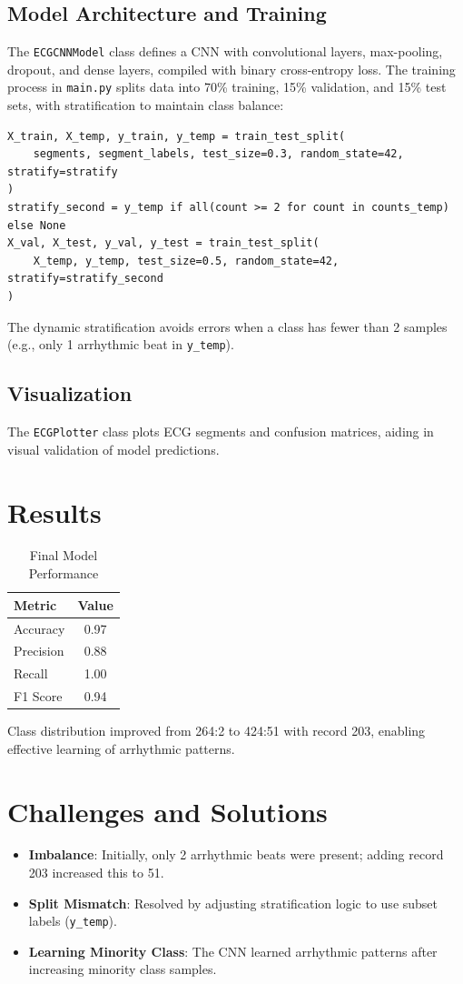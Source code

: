 \documentclass[a4paper,12pt]{article}
\begin{document}
\subsection{Model Architecture and Training}
The \texttt{ECGCNNModel} class defines a CNN with convolutional layers, max-pooling, dropout, and dense layers, compiled with binary cross-entropy loss. The training process in \texttt{main.py} splits data into 70\% training, 15\% validation, and 15\% test sets, with stratification to maintain class balance:
\begin{lstlisting}
X_train, X_temp, y_train, y_temp = train_test_split(
    segments, segment_labels, test_size=0.3, random_state=42, stratify=stratify
)
stratify_second = y_temp if all(count >= 2 for count in counts_temp) else None
X_val, X_test, y_val, y_test = train_test_split(
    X_temp, y_temp, test_size=0.5, random_state=42, stratify=stratify_second
)
\end{lstlisting}
The dynamic stratification avoids errors when a class has fewer than 2 samples (e.g., only 1 arrhythmic beat in \texttt{y\_temp}).

\subsection{Visualization}
The \texttt{ECGPlotter} class plots ECG segments and confusion matrices, aiding in visual validation of model predictions.

\section{Results}
\begin{table}[h]
    \centering
    \begin{tabular}{lc}
        \toprule
        Metric & Value \\
        \midrule
        Accuracy & 0.97 \\
        Precision & 0.88 \\
        Recall & 1.00 \\
        F1 Score & 0.94 \\
        \bottomrule
    \end{tabular}
    \caption{Final Model Performance}
\end{table}
Class distribution improved from 264:2 to 424:51 with record 203, enabling effective learning of arrhythmic patterns.

\section{Challenges and Solutions}
\begin{itemize}
    \item \textbf{Imbalance}: Initially, only 2 arrhythmic beats were present; adding record 203 increased this to 51.
    \item \textbf{Split Mismatch}: Resolved by adjusting stratification logic to use subset labels (\texttt{y\_temp}).
    \item \textbf{Learning Minority Class}: The CNN learned arrhythmic patterns after increasing minority class samples.
\end{itemize}
\end{document}
